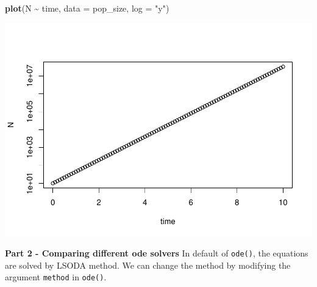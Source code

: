 \documentclass[
]{book}
\newenvironment{Shaded}{\begin{snugshade}}{\end{snugshade}}
\newcommand{\AttributeTok}[1]{\textcolor[rgb]{0.13,0.29,0.53}{#1}}
\newcommand{\FunctionTok}[1]{\textcolor[rgb]{0.13,0.29,0.53}{\textbf{#1}}}
\newcommand{\NormalTok}[1]{#1}
\newcommand{\SpecialCharTok}[1]{\textcolor[rgb]{0.81,0.36,0.00}{\textbf{#1}}}
\newcommand{\StringTok}[1]{\textcolor[rgb]{0.31,0.60,0.02}{#1}}
\begin{document}
\begin{Shaded}
\begin{Highlighting}[]
\FunctionTok{plot}\NormalTok{(N }\SpecialCharTok{\textasciitilde{}}\NormalTok{ time, }\AttributeTok{data =}\NormalTok{ pop\_size, }\AttributeTok{log =} \StringTok{"y"}\NormalTok{)}
\end{Highlighting}
\end{Shaded}

\includegraphics{bookdown-demo_files/figure-latex/unnamed-chunk-5-2.pdf}

\textbf{Part 2 - Comparing different ode solvers}
In default of \texttt{ode()}, the equations are solved by LSODA method. We can change the method by modifying the argument \texttt{method} in \texttt{ode()}.
\end{document}
